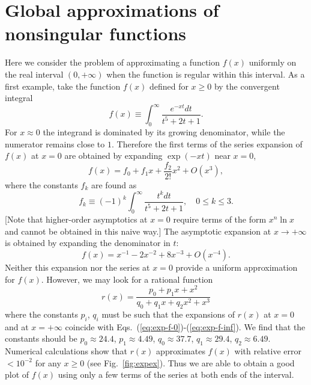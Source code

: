 \documentclass{llncs}
\begin{document}
\section{Global approximations of nonsingular functions}

Here we consider the problem of approximating a function $f\left(x\right)$
uniformly on the real interval $\left(0,+\infty \right)$ when the
function is regular within this interval. As a first example, take
the function $f\left(x\right)$ defined for $x\geq 0$ by the convergent
integral\begin{equation}
f\left(x\right)\equiv \int _{0}^{\infty }\frac{e^{-xt}dt}{t^{5}+2t+1}.\label{eq:expex-fn}\end{equation}
For $x\approx 0$ the integrand is dominated by its growing denominator,
while the numerator remains close to $1$. Therefore the first terms
of the series expansion of $f\left(x\right)$ at $x=0$ are obtained
by expanding $\exp \left(-xt\right)$ near $x=0$,\begin{equation}
f\left(x\right)=f_{0}+f_{1}x+\frac{f_{2}}{2!}x^{2}+O\left(x^{3}\right),\label{eq:exp-f-0}\end{equation}
where the constants $f_{k}$ are found as\begin{equation}
f_{k}\equiv \left(-1\right)^{k}\int _{0}^{\infty }\frac{t^{k}dt}{t^{5}+2t+1},\quad 0\leq k\leq 3.\end{equation}
{[}Note that higher-order asymptotics at $x=0$ require terms of the
form $x^{n}\ln x$ and cannot be obtained in this naive way.{]} The
asymptotic expansion at $x\rightarrow +\infty $ is obtained by expanding
the denominator in $t$:\begin{equation}
f\left(x\right)=x^{-1}-2x^{-2}+8x^{-3}+O\left(x^{-4}\right).\label{eq:exp-f-inf}\end{equation}
Neither this expansion nor the series at $x=0$ provide a uniform
approximation for $f\left(x\right)$. However, we may look for a rational
function\begin{equation}
r\left(x\right)=\frac{p_{0}+p_{1}x+x^{2}}{q_{0}+q_{1}x+q_{2}x^{2}+x^{3}}\end{equation}
where the constants $p_{i}$, $q_{i}$ must be such that the expansions
of $r\left(x\right)$ at $x=0$ and at $x=+\infty $ coincide with
Eqs.~(\ref{eq:exp-f-0})-(\ref{eq:exp-f-inf}). We find that the
constants should be $p_{0}\approx 24.4$, $p_{1}\approx 4.49$, $q_{0}\approx 37.7$,
$q_{1}\approx 29.4$, $q_{2}\approx 6.49$. Numerical calculations
show that $r\left(x\right)$ approximates $f\left(x\right)$ with
relative error $<10^{-2}$ for any $x\geq 0$ (see Fig.~\ref{fig:expex}).
Thus we are able to obtain a good plot of $f\left(x\right)$ using
only a few terms of the series at both ends of the interval.
\end{document}
